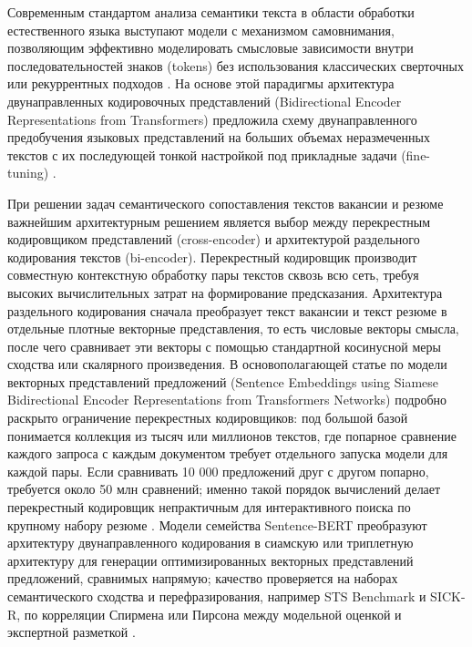 Современным стандартом анализа семантики текста в области обработки естественного языка выступают модели с механизмом самовнимания, позволяющим эффективно моделировать смысловые зависимости внутри последовательностей знаков (tokens) без использования классических сверточных или рекуррентных подходов \cite{src07}. На основе этой парадигмы архитектура двунаправленных кодировочных представлений (Bidirectional Encoder Representations from Transformers) предложила схему двунаправленного предобучения языковых представлений на больших объемах неразмеченных текстов с их последующей тонкой настройкой под прикладные задачи (fine-tuning) \cite{src05}.

При решении задач семантического сопоставления текстов вакансии и резюме важнейшим архитектурным решением является выбор между перекрестным кодировщиком представлений (cross-encoder) и архитектурой раздельного кодирования текстов (bi-encoder). Перекрестный кодировщик производит совместную контекстную обработку пары текстов сквозь всю сеть, требуя высоких вычислительных затрат на формирование предсказания. Архитектура раздельного кодирования сначала преобразует текст вакансии и текст резюме в отдельные плотные векторные представления, то есть числовые векторы смысла, после чего сравнивает эти векторы с помощью стандартной косинусной меры сходства или скалярного произведения. В основополагающей статье по модели векторных представлений предложений (Sentence Embeddings using Siamese Bidirectional Encoder Representations from Transformers Networks) подробно раскрыто ограничение перекрестных кодировщиков: под большой базой понимается коллекция из тысяч или миллионов текстов, где попарное сравнение каждого запроса с каждым документом требует отдельного запуска модели для каждой пары. Если сравнивать 10 000 предложений друг с другом попарно, требуется около 50 млн сравнений; именно такой порядок вычислений делает перекрестный кодировщик непрактичным для интерактивного поиска по крупному набору резюме \cite{src06}. Модели семейства Sentence-BERT преобразуют архитектуру двунаправленного кодирования в сиамскую или триплетную архитектуру для генерации оптимизированных векторных представлений предложений, сравнимых напрямую; качество проверяется на наборах семантического сходства и перефразирования, например STS Benchmark и SICK-R, по корреляции Спирмена или Пирсона между модельной оценкой и экспертной разметкой \cite{src06, src29}.

